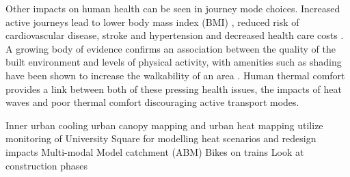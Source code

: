 \documentclass[final,3p,times,authoryear]{elsarticle}
\begin{document}
Other impacts on human health can be seen in journey mode choices. Increased active journeys lead to lower body mass index (BMI) \citep{Davison2008,Lee2008b}, reduced risk of cardiovascular disease, stroke and hypertension \citep{WHO2010,Warburton2006} and decreased health care costs \citep{Stephenson2000}. A growing body of evidence confirms an association between the quality of the built environment and levels of physical activity, with amenities such as shading have been shown to increase the walkability of an area \citep{Millington2009,Gallin2001,LSA2003}. Human thermal comfort provides a link between both of these pressing health issues, the impacts of heat waves and poor thermal comfort discouraging active transport modes. 







Inner urban cooling
	urban canopy mapping and urban heat mapping
	utilize monitoring of University Square for modelling
	heat scenarios and redesign impacts
Multi-modal
	Model catchment (ABM)
	Bikes on trains
	Look at construction phases




%
\end{document}
